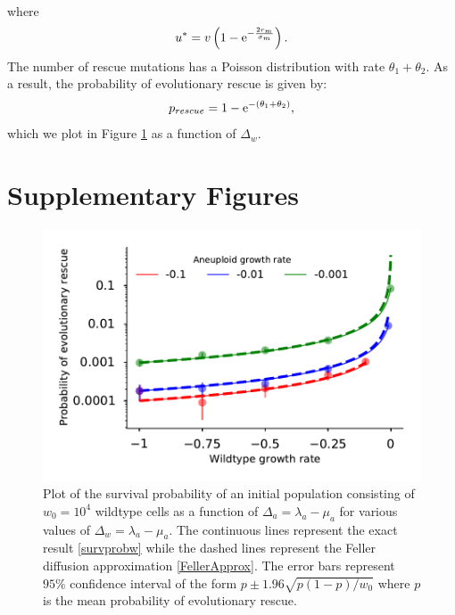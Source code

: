 \documentclass[12pt]{extarticle}
\newcommand{\e}{{\rm e}}
\newcommand{\beginsupplement}{%
      	\setcounter{table}{0}
        \renewcommand{\thetable}{S\arabic{table}}%
        \setcounter{figure}{0}
        \renewcommand{\thefigure}{S\arabic{figure}}%
		\setcounter{equation}{0}
        \renewcommand{\theequation}{A\arabic{equation}}%
}
\begin{document}
\begin{appendices}
\begin{align*}
\end{align*}
where
\begin{equation}
u^*=v\left(1-\e^{-\frac{2r_m}{\sigma_m}}\right).
\end{equation}
The number of rescue mutations has a Poisson distribution with rate $\theta_1+\theta_2$. As a result, the probability of evolutionary rescue is given by:
\begin{equation}\label{FellerApprox}
p_{rescue}=1-\e^{-\left(\theta_1+\theta_2\right)},
\end{equation}
which we plot in Figure \ref{P_est_diffusion} as a function of $\Delta_w$.
\end{appendices}

\newpage
\section*{Supplementary Figures}
\beginsupplement %
\begin{figure}[!h]
 \vspace*{1\baselineskip}
\includegraphics[width=1\textwidth]{Figures/P_est_diffusion.pdf}
\caption{Plot of the survival probability of an initial population consisting of $w_0=10^{4}$ wildtype cells as a function of $\Delta_a=\lambda_a-\mu_a$ for various values of $\Delta_w=\lambda_a-\mu_a$. The continuous lines represent the exact result \eqref{survprobw} while the dashed lines represent the Feller diffusion approximation \eqref{FellerApprox}. The error bars represent $95\%$ confidence interval of the form $p\pm1.96\sqrt{p\left(1-p\right)/w_0}$ where $p$ is the mean probability of evolutionary rescue.}
\label{P_est_diffusion}
\end{figure}
\end{document}
